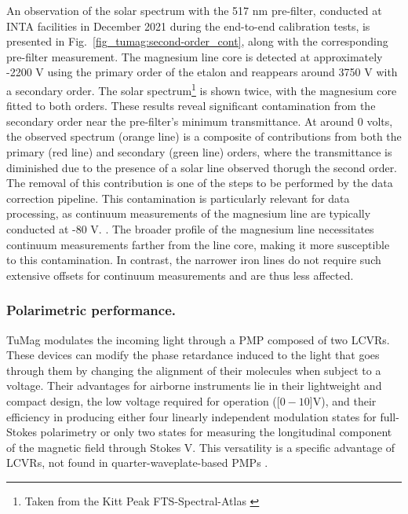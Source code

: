 An observation of the solar spectrum with the 517 nm pre-filter, conducted at INTA facilities in December 2021 during the end-to-end calibration tests, is presented in Fig.~\ref{fig_tumag:second-order_cont}, along with the corresponding pre-filter measurement. The magnesium line core is detected at approximately -2200 V using the primary order of the etalon and reappears around 3750 V with a secondary order. The solar spectrum\footnote{Taken from the Kitt Peak FTS-Spectral-Atlas \citep{fts}} is shown twice, with the magnesium core fitted to both orders. These results reveal significant contamination from the secondary order near the pre-filter's minimum transmittance. At around 0 volts, the observed spectrum (orange line) is a composite of contributions from both the primary (red line) and secondary (green line) orders, where the transmittance is diminished due to the presence of a solar line observed thorugh the second order. The removal of this contribution is one of the steps to be performed by the data correction pipeline. This contamination is particularly relevant for data processing, as continuum measurements of the magnesium line are typically conducted at -80 V. . The broader profile of the magnesium line necessitates continuum measurements farther from the line core, making it more susceptible to this contamination. In contrast, the narrower iron lines do not require such extensive offsets for continuum measurements and are thus less affected.

\subsubsection{\label{sect:tumag_cal polarimetric}Polarimetric performance.}

TuMag modulates the incoming light through a PMP composed of two LCVRs. These devices can modify the phase retardance induced to the light that goes through them by changing the alignment of their molecules when subject to a voltage. Their advantages for airborne instruments lie in their lightweight and compact design, the low voltage required for operation ([$0 - 10$]V), and their efficiency in producing either four linearly independent modulation states for full-Stokes polarimetry or only two states for measuring the longitudinal component of the magnetic field through Stokes V. This versatility is a specific advantage of LCVRs, not found in quarter-waveplate-based PMPs \citep{pmp-advantages}.

